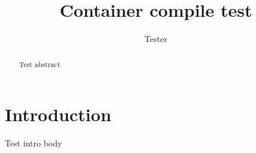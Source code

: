 \documentclass{article}
\title{Container compile test}
\author{Tester}
\begin{document}
\maketitle
\begin{abstract}
Test abstract
\end{abstract}
\section{Introduction}
Test intro body
\end{document}
